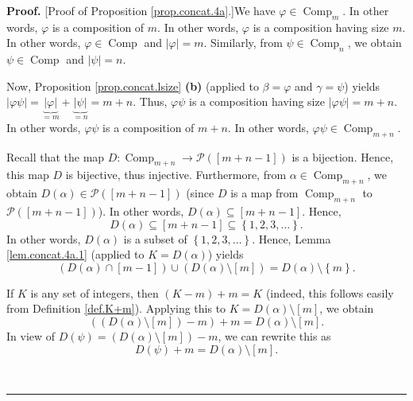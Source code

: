 \documentclass[numbers=enddot,12pt,final,onecolumn,notitlepage]{scrartcl}%
\theoremstyle{definition}
\newenvironment{proof}[1][Proof]{\noindent\textbf{#1.} }{\ \rule{0.5em}{0.5em}}
\begin{document}
\begin{proof}
[Proof of Proposition \ref{prop.concat.4a}.]We have $\varphi\in
\operatorname*{Comp}\nolimits_{m}$. In other words, $\varphi$ is a composition
of $m$. In other words, $\varphi$ is a composition having size $m$. In other
words, $\varphi\in\operatorname*{Comp}$ and $\left\vert \varphi\right\vert
=m$. Similarly, from $\psi\in\operatorname*{Comp}\nolimits_{n}$, we obtain
$\psi\in\operatorname*{Comp}$ and $\left\vert \psi\right\vert =n$.

Now, Proposition \ref{prop.concat.lsize} \textbf{(b)} (applied to
$\beta=\varphi$ and $\gamma=\psi$) yields $\left\vert \varphi\psi\right\vert
=\underbrace{\left\vert \varphi\right\vert }_{=m}+\underbrace{\left\vert
\psi\right\vert }_{=n}=m+n$. Thus, $\varphi\psi$ is a composition having size
$\left\vert \varphi\psi\right\vert =m+n$. In other words, $\varphi\psi$ is a
composition of $m+n$. In other words, $\varphi\psi\in\operatorname*{Comp}%
\nolimits_{m+n}$.

Recall that the map $D:\operatorname*{Comp}\nolimits_{m+n}\rightarrow
\mathcal{P}\left(  \left[  m+n-1\right]  \right)  $ is a bijection. Hence,
this map $D$ is bijective, thus injective. Furthermore, from $\alpha
\in\operatorname*{Comp}\nolimits_{m+n}$, we obtain $D\left(  \alpha\right)
\in\mathcal{P}\left(  \left[  m+n-1\right]  \right)  $ (since $D$ is a map
from $\operatorname*{Comp}\nolimits_{m+n}$ to $\mathcal{P}\left(  \left[
m+n-1\right]  \right)  $). In other words, $D\left(  \alpha\right)
\subseteq\left[  m+n-1\right]  $. Hence,%
\[
D\left(  \alpha\right)  \subseteq\left[  m+n-1\right]  \subseteq\left\{
1,2,3,\ldots\right\}  .
\]
In other words, $D\left(  \alpha\right)  $ is a subset of $\left\{
1,2,3,\ldots\right\}  $. Hence, Lemma \ref{lem.concat.4a.1} (applied to
$K=D\left(  \alpha\right)  $) yields%
\begin{equation}
\left(  D\left(  \alpha\right)  \cap\left[  m-1\right]  \right)  \cup\left(
D\left(  \alpha\right)  \setminus\left[  m\right]  \right)  =D\left(
\alpha\right)  \setminus\left\{  m\right\}  . \label{pf.prop.concat.4a.1}%
\end{equation}


If $K$ is any set of integers, then $\left(  K-m\right)  +m=K$ (indeed, this
follows easily from Definition \ref{def.K+m}). Applying this to $K=D\left(
\alpha\right)  \setminus\left[  m\right]  $, we obtain%
\[
\left(  \left(  D\left(  \alpha\right)  \setminus\left[  m\right]  \right)
-m\right)  +m=D\left(  \alpha\right)  \setminus\left[  m\right]  .
\]
In view of $D\left(  \psi\right)  =\left(  D\left(  \alpha\right)
\setminus\left[  m\right]  \right)  -m$, we can rewrite this as%
\begin{equation}
D\left(  \psi\right)  +m=D\left(  \alpha\right)  \setminus\left[  m\right]  .
\label{pf.prop.concat.4a.Dpsi+m}%
\end{equation}



\end{proof}
\end{document}
